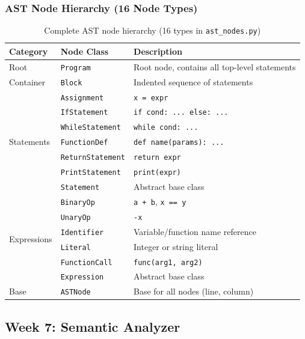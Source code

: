 \documentclass[a4paper,11pt]{article}
\begin{document}
\subsubsection{AST Node Hierarchy (16 Node Types)}

\begin{table}[h!]
\centering
\begin{tabular}{|l|l|l|}
\hline
\rowcolor{blue!10}
\textbf{Category} & \textbf{Node Class} & \textbf{Description} \\
\hline
Root & \texttt{Program} & Root node, contains all top-level statements \\
\hline
Container & \texttt{Block} & Indented sequence of statements \\
\hline
\multirow{7}{*}{Statements} & \texttt{Assignment} & \texttt{x = expr} \\
 & \texttt{IfStatement} & \texttt{if cond: ... else: ...} \\
 & \texttt{WhileStatement} & \texttt{while cond: ...} \\
 & \texttt{FunctionDef} & \texttt{def name(params): ...} \\
 & \texttt{ReturnStatement} & \texttt{return expr} \\
 & \texttt{PrintStatement} & \texttt{print(expr)} \\
 & \texttt{Statement} & Abstract base class \\
\hline
\multirow{6}{*}{Expressions} & \texttt{BinaryOp} & \texttt{a + b}, \texttt{x == y} \\
 & \texttt{UnaryOp} & \texttt{-x} \\
 & \texttt{Identifier} & Variable/function name reference \\
 & \texttt{Literal} & Integer or string literal \\
 & \texttt{FunctionCall} & \texttt{func(arg1, arg2)} \\
 & \texttt{Expression} & Abstract base class \\
\hline
\multirow{1}{*}{Base} & \texttt{ASTNode} & Base for all nodes (line, column) \\
\hline
\end{tabular}
\caption{Complete AST node hierarchy (16 types in \texttt{ast\_nodes.py})}
\end{table}

\subsection{Week 7: Semantic Analyzer}
\end{document}
